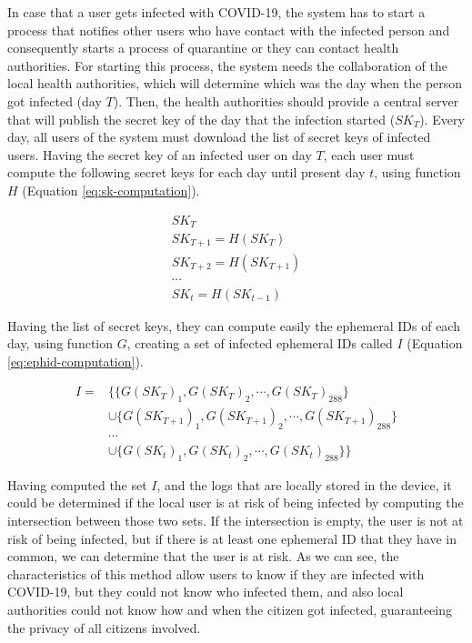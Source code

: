 \documentclass[a4paper, 12pt]{article}
\begin{document}
In case that a user gets infected with COVID-19, the system has to start a process that notifies other users who have contact with the infected person and consequently starts a process of quarantine or they can contact health authorities. For starting this process, the system needs the collaboration of the local health authorities, which will determine which was the day when the person got infected (day $T$). Then, the health authorities should provide a central server that will publish the secret key of the day that the infection started ($SK_T$). Every day, all users of the system must download the list of secret keys of infected users. Having the secret key of an infected user on day $T$, each user must compute the following secret keys for each day until present day $t$, using function $H$ (Equation \ref{eq:sk-computation}).

\begin{equation}
    \begin{split}
        SK_T \\
        SK_{T+1} = H(SK_T) \\
        SK_{T+2} = H(SK_{T+1}) \\
        \cdots \\
        SK_t = H(SK_{t-1})
    \end{split}
    \label{eq:sk-computation}
\end{equation}

Having the list of secret keys, they can compute easily the ephemeral IDs of each day, using function $G$, creating a set of infected ephemeral IDs called $I$ (Equation \ref{eq:ephid-computation}).

\begin{equation}
\begin{aligned}
I ={} & \{\{G(SK_T)_1, G(SK_T)_2, \cdots, G(SK_T)_{288}\} \\
      & \cup \{G(SK_{T+1})_1, G(SK_{T+1})_2, \cdots, G(SK_{T+1})_{288}\} \\
      & \cdots \\
      & \cup \{G(SK_t)_1, G(SK_t)_2, \cdots, G(SK_t)_{288}\}\}
\end{aligned}
\label{eq:ephid-computation}
\end{equation}

Having computed the set $I$, and the logs that are locally stored in the device, it could be determined if the local user is at risk of being infected by computing the intersection between those two sets. If the intersection is empty, the user is not at risk of being infected, but if there is at least one ephemeral ID that they have in common, we can determine that the user is at risk. As we can see, the characteristics of this method allow users to know if they are infected with COVID-19, but they could not know who infected them, and also local authorities could not know how and when the citizen got infected, guaranteeing the privacy of all citizens involved.
\end{document}
